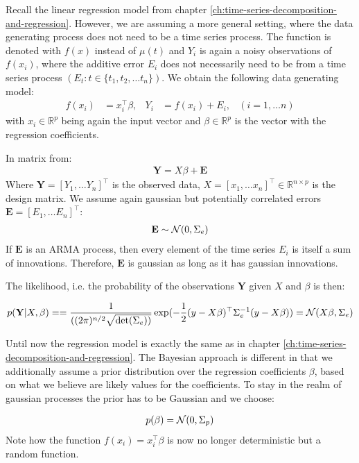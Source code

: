 Recall the linear regression model from chapter \ref{ch:time-series-decomposition-and-regression}.
However, we are assuming a more general setting, where the data generating process does not need to be a time series process.
The function is denoted with $f(x)$ instead of $\mu(t)$ and $Y_i$ is again a noisy observations of
$f(x_i)$, where the additive error $E_i$ does not necessarily need to be from a time series process $(E_t: t \in \{t_1, t_2, \dots  t_n \})$.
We obtain the following data generating model:
\begin{align*}
    f(x_i) &= x_i^{\top}\beta, & Y_i &= f(x_i) + E_i,  & (i = 1, \dots n)
\end{align*}
with $x_i \in \mathbb{R}^p$ being again the input vector and $\beta \in \mathbb{R}^p$ is the vector with
the regression coefficients.

In matrix from:
\begin{align*}
    \mathbf{Y} = X \beta + \mathbf{E}
\end{align*}
Where $\mathbf{Y} = [Y_{1}, \dots Y_{n}]^{\top}$ is the observed data,
$X = [x_{1}, \dots x_{n}]^{\top} \in \mathbb{R}^{n \times p}$ is the design matrix.
We assume again gaussian but potentially correlated errors $\mathbf{E} = [E_{1}, \dots E_{n}]^{\top}$:
\begin{gather*}
    \mathbf{E} \sim \operatorname{\mathcal{N}}(0, \Sigma_e)
\end{gather*}
If $\mathbf{E}$ is an ARMA process, then every element of the time series $E_{i}$
is itself a sum of innovations.
Therefore, $\mathbf{E}$ is gaussian as long as it has gaussian innovations.

The likelihood, i.e. the probability of the observations $\mathbf{Y}$ given $X$ and $\beta$ is then:

\begin{gather*}
    p(\mathbf{Y}|X,\beta) =
    = \frac{1}{( (2\pi)^{n/2} \sqrt {\det(\Sigma_e))}}
    \exp(-\frac{1}{2}(y - X\beta)^{\top} \Sigma_e^{-1}(y-X\beta))
    = \operatorname{\mathcal{N}}(X \beta, \Sigma_e)
\end{gather*}

Until now the regression model is exactly the same as in chapter \ref{ch:time-series-decomposition-and-regression}.
The Bayesian approach is different in that we additionally assume a prior distribution over the
regression coefficients $\beta$, based on what we believe are likely values for the coefficients.
To stay in the realm of gaussian processes the prior has to be Gaussian and we choose:

\begin{gather*}
    p(\beta) = \operatorname{\mathcal{N}}(0, \Sigma_p)
\end{gather*}
Note how the function $f(x_i)=x_i^{\top}\beta$ is now no longer deterministic but a random function.

